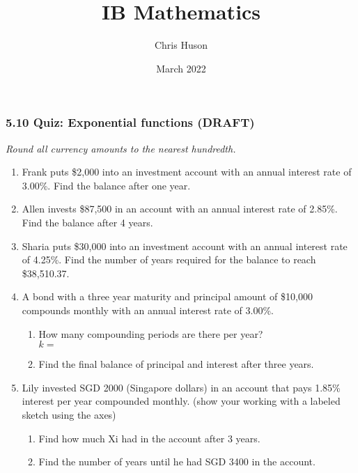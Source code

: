 \documentclass[12pt, twoside]{article}
\title{IB Mathematics}
\author{Chris Huson}
\date{March 2022}
\begin{document}
\subsubsection*{5.10 Quiz: Exponential functions (DRAFT)}
\emph{Round all currency amounts to the nearest hundredth.}
\begin{enumerate}
\item Frank puts \$2,000 into an investment account with an annual interest rate of 3.00\%. Find the balance after one year. \vspace{1.5cm}

\item Allen invests \$87,500 in an account with an annual interest rate of 2.85\%. Find the balance after 4 years. \vspace{1.5cm}

\item Sharia puts \$30,000 into an investment account with an annual interest rate of 4.25\%. Find the number of years required for the balance to reach \$38,510.37. \vspace{2cm}

\item A bond with a three year maturity and principal amount of \$10,000 compounds monthly with an annual interest rate of 3.00\%.
\begin{enumerate}[itemsep=0.5cm]
    \item How many compounding periods are there per year? \\[0.25cm]
    $k=$
    \item Find the final balance of principal and interest after three years.
\end{enumerate} \vspace{1.5cm}

\item Lily invested SGD 2000 (Singapore dollars) in an account that pays 1.85\% interest per year compounded monthly. (show your working with a labeled sketch using the axes)
\begin{multicols}{2}
    \begin{enumerate}[itemsep=1cm]
        \item Find how much Xi had in the account after 3 years.
        \item Find the number of years until he had SGD 3400 in the account.
    \end{enumerate} \vspace{0.5cm}
    \begin{flushright}
    \end{flushright}
\end{multicols}



\end{enumerate}
\end{document}
